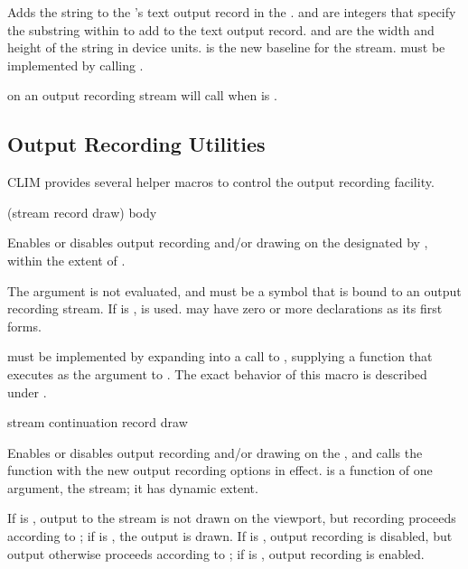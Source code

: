Adds the string  to the 
's text output record in the  .
 and  are integers that specify the substring within
 to add to the text output record.   and  are
the width and height of the string in device units.   is the new
baseline for the stream.   must be implemented by
calling .

 on an output recording stream will call
 when  is .


\subsection {Output Recording Utilities}

CLIM provides several helper macros to control the output recording facility.

 {(stream \key record draw) \body body} 

Enables or disables output recording and/or drawing on the  designated by , within the extent of .

The  argument is not evaluated, and must be a symbol that is bound to
an output recording stream.  If  is ,  is
used.  may have zero or more declarations as its first forms.

 must be implemented by expanding into a call
to , supplying a function that executes
 as the  argument to
.  The exact behavior of this macro is
described under .

 {stream continuation record draw}

Enables or disables output recording and/or drawing on the  , and calls the function  with
the new output recording options in effect.   is a function
of one argument, the stream; it has dynamic extent.

If  is , output to the stream is not drawn on the
viewport, but recording proceeds according to ; if  is
, the output is drawn.  If  is , output recording
is disabled, but output otherwise proceeds according to ; if
 is , output recording is enabled.

